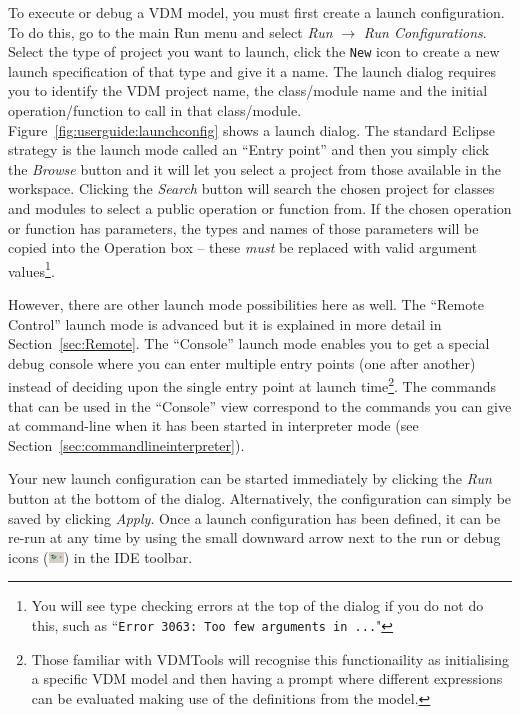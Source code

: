 \documentclass{overturerepchap}
\begin{document}
To execute or debug a VDM model, you must first create a launch
configuration. To do this, go to the main Run menu
and select \emph{Run} $\rightarrow $ \emph{Run Configurations}. Select the type of
project you want to launch, click the \texttt{New} icon to
create a new launch specification of that type and give it a name. The
launch dialog requires you to identify the VDM project name,
the class/module name and the initial operation/function to call in that
class/module. Figure~\ref{fig:userguide:launchconfig} shows a launch
dialog. The standard Eclipse strategy is the launch mode called an
``Entry point'' and then you simply click
the \emph{Browse} button and it will let you select a project from
those available in the workspace. Clicking the \emph{Search} button will search the chosen
project for classes and modules to select a public operation or function from.
If the chosen operation or function has parameters, the types and names of those
parameters will be copied into the Operation box -- these \emph{must} be replaced with
valid argument values\footnote{You will see type checking errors at the top of the
dialog if you do not do this, such as ``\texttt{Error 3063: Too few arguments in ...}"}.

However, there are other launch mode possibilities here as
well. The
``Remote Control'' launch mode is advanced but it is explained in more
detail in Section~\ref{sec:Remote}. The ``Console'' launch mode
enables you to get a special debug console where you can enter
multiple entry points (one after another) instead of deciding upon the
single entry point at launch time\footnote{Those familiar with
  VDMTools will recognise this functionaility as initialising a
  specific VDM model and then having a prompt where different
  expressions can be evaluated making use of the definitions from the model.}.
The commands that can be used in the ``Console'' view correspond to
the commands you can give at command-line when it has been started in
interpreter mode (see Section~\ref{sec:commandlineinterpreter}).

Your new launch configuration can be started immediately by clicking the \emph{Run}
button at the bottom of the dialog. Alternatively, the configuration can simply be
saved by clicking \emph{Apply}. Once a launch configuration has been defined, it
can be re-run at any time by using the small downward arrow next to the run or
debug icons (\includegraphics[width=0.03\textwidth]{icons/debuggericon})
in the IDE toolbar.
\end{document}
